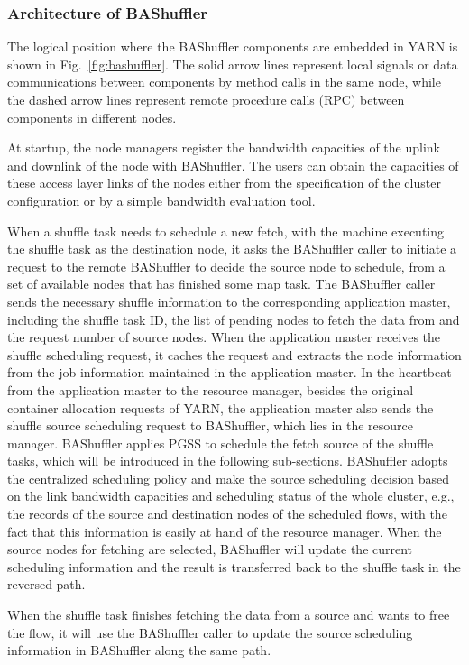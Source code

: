 \documentclass[10pt,journal,compsoc]{IEEEtran}
\begin{document}
\subsubsection{Architecture of BAShuffler}
The logical position where the BAShuffler components are embedded in YARN is shown in Fig.~\ref{fig:bashuffler}. 
The solid arrow lines represent local signals or data communications
between components by method calls in the same node,
while the dashed arrow lines represent remote procedure calls (RPC)
between components in different nodes.

At startup, the node managers register the bandwidth capacities of the uplink
and downlink of the node with BAShuffler. The users can obtain the
capacities of these access layer links of the nodes either from the
specification of the cluster configuration or by a simple bandwidth
evaluation tool.

When a shuffle task needs to schedule a new fetch, with the machine executing the shuffle task as the destination node, it asks the
BAShuffler caller to initiate a request to the remote BAShuffler
to decide the source node to schedule, from a set of available nodes that has finished some map task.
The BAShuffler caller sends the necessary shuffle information to the
corresponding application master,
including the shuffle task ID, the list of pending nodes to fetch
the data from and the request number of source nodes.
When the application master receives the shuffle scheduling request, 
it caches the request and extracts the node information from the job
information maintained in the application master.
In the heartbeat from the application master to the resource manager,
besides the original container allocation requests
of YARN, the application master also sends the shuffle source
scheduling request to BAShuffler, which lies in the resource manager.
BAShuffler applies PGSS to schedule the fetch source of the shuffle tasks, which will be introduced in the following sub-sections. 
BAShuffler adopts the centralized scheduling policy and make the source scheduling decision based on the link
bandwidth capacities and scheduling status of the whole cluster, e.g., the records of the source and
destination nodes of the scheduled flows, 
with the fact that this information is easily at hand of the resource manager.
When the source nodes for fetching are selected, BAShuffler will
update the current scheduling information and
the result is transferred back to the shuffle task in the reversed path. 

When the shuffle task finishes fetching the data from a source and
wants to free the flow,
it will use the BAShuffler caller to update the source scheduling
information in BAShuffler along the same path.
\end{document}
